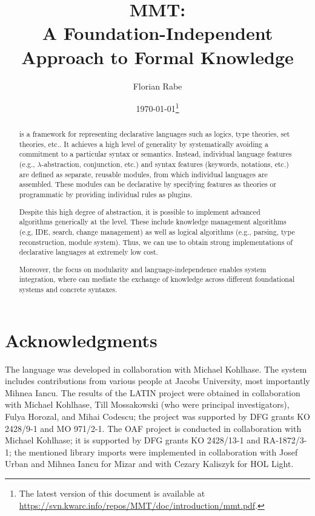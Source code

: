 \documentclass[12pt]{article}
\begin{document}
\author{Florian Rabe}
\title{MMT:\\ A Foundation-Independent Approach to Formal Knowledge}
\date{\today\footnote{The latest version of this document is available at \url{https://svn.kwarc.info/repos/MMT/doc/introduction/mmt.pdf}.}}
\maketitle

\begin{abstract}
\mmt is a framework for representing declarative languages such as logics, type theories, set theories, etc..
It achieves a high level of generality by systematically avoiding a commitment to a particular syntax or semantics.
Instead, individual language features (e.g., $\lambda$-abstraction, conjunction, etc.) and syntax features (keywords, notations, etc.) are defined as separate, reusable modules, from which individual languages are assembled.
These modules can be declarative by specifying features as \mmt theories or programmatic by providing individual rules as plugins.

Despite this high degree of abstraction, it is possible to implement advanced algorithms generically at the \mmt level.
These include knowledge management algorithms (e.g, IDE, search, change management) as well as logical algorithms (e.g., parsing, type reconstruction, module system).
Thus, we can use \mmt to obtain strong implementations of declarative languages at extremely low cost.

Moreover, the focus on modularity and language-independence enables system integration, where \mmt can mediate the exchange of knowledge across different foundational systems and concrete syntaxes.
\end{abstract}



\section*{Acknowledgments}

The \mmt language was developed in collaboration with Michael Kohlhase.
The \mmt system includes contributions from various people at Jacobs University, most importantly Mihnea Iancu.
The results of the LATIN project were obtained in collaboration with Michael Kohlhase, Till Mossakowski (who were principal investigators), Fulya Horozal, and Mihai Codescu; the project was supported by DFG grants KO 2428/9-1 and MO 971/2-1.
The OAF project is conducted in collaboration with Michael Kohlhase; it is supported by DFG grants KO 2428/13-1 and RA-1872/3-1; the mentioned library imports were implemented in collaboration with Josef Urban and Mihnea Iancu for Mizar and with Cezary Kaliszyk for HOL Light.



\end{document}
